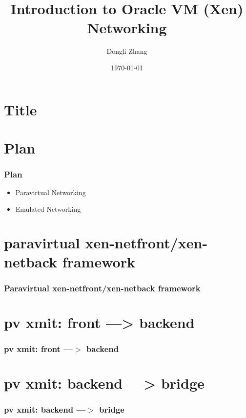 \documentclass[aspectratio=169]{beamer}
\title[Introduction to Oracle VM (Xen) Networking]{Introduction to Oracle VM (Xen) Networking} %
\author{Dongli Zhang} %
\institute[Oracle] %
{
Oracle Asia Research and Development Centers (Beijing) \\ %
\medskip
\textit{dongli.zhang@oracle.com} %
}
\date{\today} %
\begin{document}

\section{Title}
\begin{frame}
\titlepage %
\end{frame}


\section{Plan}
\begin{frame}
\frametitle{Plan}
\begin{itemize}
\setlength\itemsep{1em}
\item {\large Paravirtual Networking}
\item {\large Emulated Networking}
\end{itemize}
\end{frame}


\section{paravirtual xen-netfront/xen-netback framework}
\begin{frame}
\frametitle{Paravirtual xen-netfront/xen-netback framework}
\end{frame}


\section{pv xmit: front ---> backend}
\begin{frame}
\frametitle{pv xmit: front ---$>$ backend}
\end{frame}


\section{pv xmit: backend ---> bridge}
\begin{frame}
\frametitle{pv xmit: backend ---$>$ bridge}
\end{frame}
\end{document}
